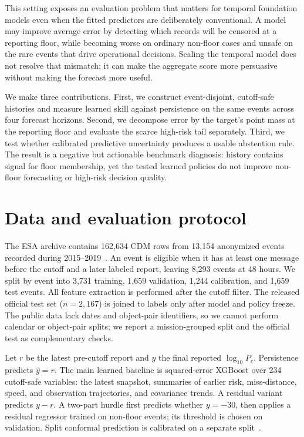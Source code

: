 \documentclass{article}
\begin{document}
This setting exposes an evaluation problem that matters for temporal foundation models even when the fitted predictors are deliberately conventional. A model may improve average error by detecting which records will be censored at a reporting floor, while becoming worse on ordinary non-floor cases and unsafe on the rare events that drive operational decisions. Scaling the temporal model does not resolve that mismatch; it can make the aggregate score more persuasive without making the forecast more useful.

We make three contributions. First, we construct event-disjoint, cutoff-safe histories and measure learned skill against persistence on the same events across four forecast horizons. Second, we decompose error by the target's point mass at the reporting floor and evaluate the scarce high-risk tail separately. Third, we test whether calibrated predictive uncertainty produces a usable abstention rule. The result is a negative but actionable benchmark diagnosis: history contains signal for floor membership, yet the tested learned policies do not improve non-floor forecasting or high-risk decision quality.

\section{Data and evaluation protocol}

The ESA archive contains 162,634 CDM rows from 13,154 anonymized events recorded during 2015--2019~\citep{esaKelvins,uriot2021}. An event is eligible when it has at least one message before the cutoff and a later labeled report, leaving 8,293 events at 48 hours. We split by event into 3,731 training, 1,659 validation, 1,244 calibration, and 1,659 test events. All feature extraction is performed after the cutoff filter. The released official test set ($n=2,167$) is joined to labels only after model and policy freeze. The public data lack dates and object-pair identifiers, so we cannot perform calendar or object-pair splits; we report a mission-grouped split and the official test as complementary checks.

Let $r$ be the latest pre-cutoff report and $y$ the final reported $\log_{10} P_c$. Persistence predicts $\hat y=r$. The main learned baseline is squared-error XGBoost over 234 cutoff-safe variables: the latest snapshot, summaries of earlier risk, miss-distance, speed, and observation trajectories, and covariance trends. A residual variant predicts $y-r$. A two-part hurdle first predicts whether $y=-30$, then applies a residual regressor trained on non-floor events; its threshold is chosen on validation. Split conformal prediction is calibrated on a separate split~\citep{lei2018}.
\end{document}
